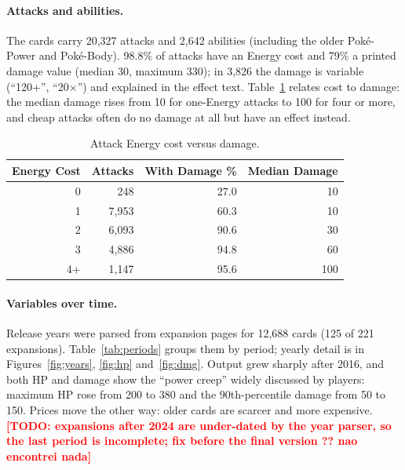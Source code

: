 \documentclass[sigconf]{acmart}
\newcommand{\todo}[1]{\textcolor{red}{\textbf{[TODO: #1]}}}
\begin{document}
  \paragraph{Attacks and abilities.}
  The cards carry 20{,}327 attacks and 2{,}642 abilities (including the older
  Pok\'e-Power and Pok\'e-Body). 98.8\% of attacks have an Energy cost and
  79\% a printed damage value (median 30, maximum 330); in 3{,}826 the damage
  is variable (``120+'', ``20$\times$'') and explained in the effect text.
  Table~\ref{tab:cost} relates cost to damage: the median damage rises from
  10 for one-Energy attacks to 100 for four or more, and cheap attacks often
  do no damage at all but have an effect instead.

  \begin{table}[ht]
      \centering
      \caption{Attack Energy cost versus damage.}
      \label{tab:cost}
      \small
      \setlength{\tabcolsep}{4pt}
      \begin{tabular}{rrrr}
          \hline
          \textbf{Energy Cost} & \textbf{Attacks} & \textbf{With Damage \%} & \textbf{Median Damage} \\
          \hline
          0 & 248 & 27.0 & 10 \\
          1 & 7{,}953 & 60.3 & 10 \\
          2 & 6{,}093 & 90.6 & 30 \\
          3 & 4{,}886 & 94.8 & 60 \\
          4+ & 1{,}147 & 95.6 & 100 \\
          \hline
      \end{tabular}
  \end{table}

  \paragraph{Variables over time.}
  Release years were parsed from expansion pages for 12{,}688 cards (125 of
  221 expansions). Table~\ref{tab:periods} groups them by period; yearly
  detail is in Figures~\ref{fig:years}, \ref{fig:hp} and~\ref{fig:dmg}.
  Output grew sharply after 2016, and both HP and damage show the ``power
  creep'' widely discussed by players: maximum HP rose from 200 to 380 and
  the 90th-percentile damage from 50 to 150. Prices move the other way:
  older cards are scarcer and more expensive.
  \todo{expansions after 2024 are under-dated by the year parser, so the
  last period is incomplete; fix before the final version ?? nao encontrei nada}
\end{document}
